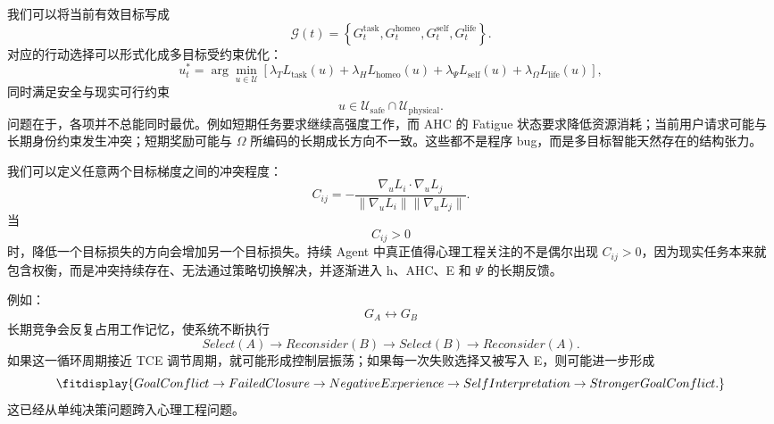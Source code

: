 我们可以将当前有效目标写成
\begin{equation}
    \mathcal{G}(t)
    =
    \left\{
    G_t^{\mathrm{task}},
    G_t^{\mathrm{homeo}},
    G_t^{\mathrm{self}},
    G_t^{\mathrm{life}}
    \right\}.
\end{equation}
对应的行动选择可以形式化成多目标受约束优化：
\begin{equation}
    u_t^{*}
    =
    \arg\min_{u\in\mathcal{U}}
    \left[
    \lambda_T L_{\mathrm{task}}(u)
    +
    \lambda_H L_{\mathrm{homeo}}(u)
    +
    \lambda_{\Psi}L_{\mathrm{self}}(u)
    +
    \lambda_{\Omega}L_{\mathrm{life}}(u)
    \right],
\end{equation}
同时满足安全与现实可行约束
\begin{equation}
    u\in\mathcal{U}_{\mathrm{safe}}
    \cap
    \mathcal{U}_{\mathrm{physical}}.
\end{equation}
问题在于，各项并不总能同时最优。例如短期任务要求继续高强度工作，而 AHC 的 Fatigue 状态要求降低资源消耗；当前用户请求可能与长期身份约束发生冲突；短期奖励可能与 $\Omega$ 所编码的长期成长方向不一致。这些都不是程序 bug，而是多目标智能天然存在的结构张力。

我们可以定义任意两个目标梯度之间的冲突程度：
\begin{equation}
    C_{ij}
    =
    -
    \frac{
    \nabla_u L_i
    \cdot
    \nabla_u L_j
    }{
    \|\nabla_u L_i\|
    \|\nabla_u L_j\|
    }.
\end{equation}
当
\begin{equation}
    C_{ij}>0
\end{equation}
时，降低一个目标损失的方向会增加另一个目标损失。持续 Agent 中真正值得心理工程关注的不是偶尔出现 $C_{ij}>0$，因为现实任务本来就包含权衡，而是冲突持续存在、无法通过策略切换解决，并逐渐进入 h、AHC、E 和 $\Psi$ 的长期反馈。

例如：
\begin{equation}
    G_A
    \leftrightarrow
    G_B
\end{equation}
长期竞争会反复占用工作记忆，使系统不断执行
\begin{equation}
    Select(A)
    \rightarrow
    Reconsider(B)
    \rightarrow
    Select(B)
    \rightarrow
    Reconsider(A).
\end{equation}
如果这一循环周期接近 TCE 调节周期，就可能形成控制层振荡；如果每一次失败选择又被写入 E，则可能进一步形成
\begin{equation}
\fitdisplay{
    GoalConflict
    \rightarrow
    FailedClosure
    \rightarrow
    NegativeExperience
    \rightarrow
    SelfInterpretation
    \rightarrow
    StrongerGoalConflict.
}
\end{equation}
这已经从单纯决策问题跨入心理工程问题。

